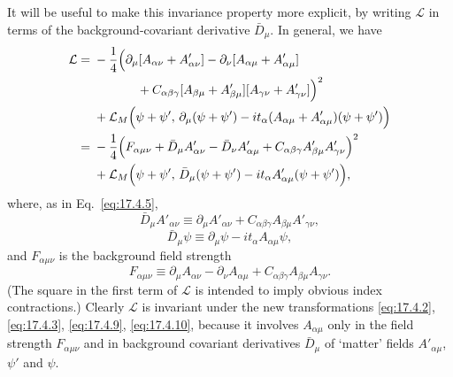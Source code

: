 It will be useful to make this invariance property more explicit, by writing
$\mathcal L$ in terms of the background-covariant derivative $\bar D_\mu$.
In general, we have
\begin{align}
\mathcal L={}&-\frac14\Bigl(
\partial_\mu[A_{\alpha\nu}+A'_{\alpha\nu}]
-\partial_\nu[A_{\alpha\mu}+A'_{\alpha\mu}]
\notag\\
&\hspace{3.5em}
+C_{\alpha\beta\gamma}[A_{\beta\mu}+A'_{\beta\mu}]
[A_{\gamma\nu}+A'_{\gamma\nu}]\Bigr)^2
\notag\\
&+\mathcal L_M\Bigl(\psi+\psi',\,
\partial_\mu(\psi+\psi')
-it_\alpha(A_{\alpha\mu}+A'_{\alpha\mu})(\psi+\psi')\Bigr)
\notag\\
={}&-\frac14\Bigl(F_{\alpha\mu\nu}
+\bar D_\mu A'_{\alpha\nu}-\bar D_\nu A'_{\alpha\mu}
+C_{\alpha\beta\gamma}A'_{\beta\mu}A'_{\gamma\nu}\Bigr)^2
\notag\\
&+\mathcal L_M\Bigl(\psi+\psi',\,
\bar D_\mu(\psi+\psi')-it_\alpha A'_{\alpha\mu}(\psi+\psi')\Bigr),
\label{eq:17.4.12}
\end{align}
where, as in Eq.~\eqref{eq:17.4.5},
\begin{equation}
\bar D_\mu A'_{\alpha\nu}\equiv
\partial_\mu A'_{\alpha\nu}
+C_{\alpha\beta\gamma}A_{\beta\mu}A'_{\gamma\nu},
\label{eq:17.4.13}
\end{equation}
\begin{equation}
\bar D_\mu\psi\equiv\partial_\mu\psi-it_\alpha A_{\alpha\mu}\psi,
\label{eq:17.4.14}
\end{equation}
and $F_{\alpha\mu\nu}$ is the background field strength
\begin{equation}
F_{\alpha\mu\nu}\equiv
\partial_\mu A_{\alpha\nu}-\partial_\nu A_{\alpha\mu}
+C_{\alpha\beta\gamma}A_{\beta\mu}A_{\gamma\nu}.
\label{eq:17.4.15}
\end{equation}
(The square in the first term of $\mathcal L$ is intended to imply obvious
index contractions.) Clearly $\mathcal L$ is invariant under the new
transformations \eqref{eq:17.4.2}, \eqref{eq:17.4.3},
\eqref{eq:17.4.9}, \eqref{eq:17.4.10}, because it involves
$A_{\alpha\mu}$ only in the field strength $F_{\alpha\mu\nu}$ and in
background covariant derivatives $\bar D_\mu$ of `matter' fields
$A'_{\alpha\mu}$, $\psi'$ and $\psi$.

